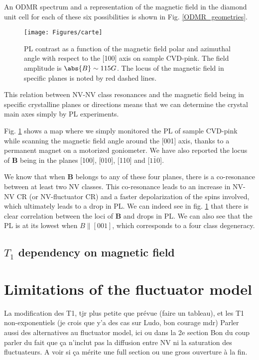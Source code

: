 \documentclass[a4paper,11pt]{report}
\begin{document}
An ODMR spectrum and a representation of the magnetic field in the diamond unit cell for each of these six possibilities is shown in Fig. \ref{ODMR_geometries}.

\begin{figure}[h]
\centering
\texttt{[image: Figures/carte]}
\caption{PL contrast as a function of the magnetic field polar and azimuthal angle with respect to the [100] axis on sample CVD-pink. The field amplitude is $\abs{B} \sim 115 G$. The locus of the magnetic field in specific planes is noted by red dashed lines.}
\label{Carte}
\end{figure}

This relation between NV-NV class resonances and the magnetic field being in specific crystalline planes or directions means that we can determine the crystal main axes simply by PL experiments.

Fig. \ref{Carte} shows a map where we simply monitored the PL of sample CVD-pink while scanning the magnetic field angle around the [001] axis, thanks to a permanent magnet on a motorized goniometer. We have also reported the locus of $\mathbf{B}$ being in the planes [100], [010], [110] and [$1\bar 1 0$].

We know that when $\mathbf{B}$ belongs to any of these four planes, there is a co-resonance between at least two NV classes. This co-resonance leads to an increase in NV-NV CR (or NV-fluctuator CR) and a faster depolarization of the spins involved, which ultimately leads to a drop in PL. We can indeed see in fig. \ref{Carte} that there is clear correlation between the loci of $\mathbf{B}$ and drops in PL. We can also see that the PL is at its lowest when $B\parallel [001]$, which corresponds to a four class degeneracy.

\subsection{$T_1$ dependency on magnetic field}

\section{Limitations of the fluctuator model}
La modification des T1, tjr plus petite que prévue (faire un tableau), et les T1 non-exponentiels (je crois que y'a des cas sur Ludo, bon courage mdr)
Parler aussi des alternatives au fluctuator model, ici ou dans la 2e section
Bon du coup parler du fait que ça n'inclut pas la diffusion entre NV ni la saturation des fluctuateurs. A voir si ça mérite une full section ou une gross ouverture à la fin.

\printbibliography
\end{document}
